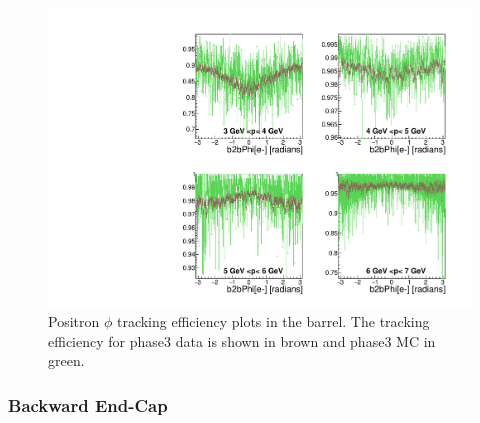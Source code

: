 \documentclass[a4paper,11pt,twosided,final,german,openbib,pdftex,listof=totoc,bibliography=totoc]{scrbook}
\begin{document}
\begin{figure}[!htbp]
	\centering
	\includegraphics[width=\textwidth]{Plots/master3/xPMPhiepBarrelP3}
	\caption[Momentum $\phi$ Positron Barrel Efficiency Phase3]{Positron $\phi$ tracking efficiency plots in the barrel. The tracking efficiency for phase3 data is shown in brown and phase3 MC in green.}
	\label{plt:xPMPhiepBarrel3}
\end{figure}

\newpage

\subsubsection{Backward End-Cap}
\end{document}
